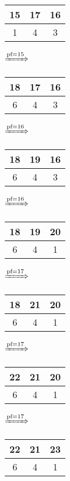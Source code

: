 \documentclass{article}
\begin{document}
\begin{itemize}
\begin{tabular}{|c|c|c|}
                \hline
                15 & 17 & 16\\
                \hline
                1 & 4 & 3\\
                \hline
            \end{tabular}
            $\xRightarrow{\text{pf}=15}$
            \begin{tabular}{|c|c|c|}
                \hline
                18 & 17 & 16\\
                \hline
                6 & 4 & 3\\
                \hline
            \end{tabular}
            $\xRightarrow{\text{pf}=16}$
            \begin{tabular}{|c|c|c|}
                \hline
                18 & 19 & 16\\
                \hline
                6 & 4 & 3\\
                \hline
            \end{tabular}
            $\xRightarrow{\text{pf}=16}$
            \begin{tabular}{|c|c|c|}
                \hline
                18 & 19 & 20\\
                \hline
                6 & 4 & 1\\
                \hline
            \end{tabular}
            $\xRightarrow{\text{pf}=17}$
            \begin{tabular}{|c|c|c|}
                \hline
                18 & 21 & 20\\
                \hline
                6 & 4 & 1\\
                \hline
            \end{tabular}
            $\xRightarrow{\text{pf}=17}$
            \begin{tabular}{|c|c|c|}
                \hline
                22 & 21 & 20\\
                \hline
                6 & 4 & 1\\
                \hline
            \end{tabular}
            $\xRightarrow{\text{pf}=17}$
            \begin{tabular}{|c|c|c|}
                \hline
                22 & 21 & 23\\
                \hline
                6 & 4 & 1\\
                \hline
            \end{tabular}

\end{itemize}
\end{document}
